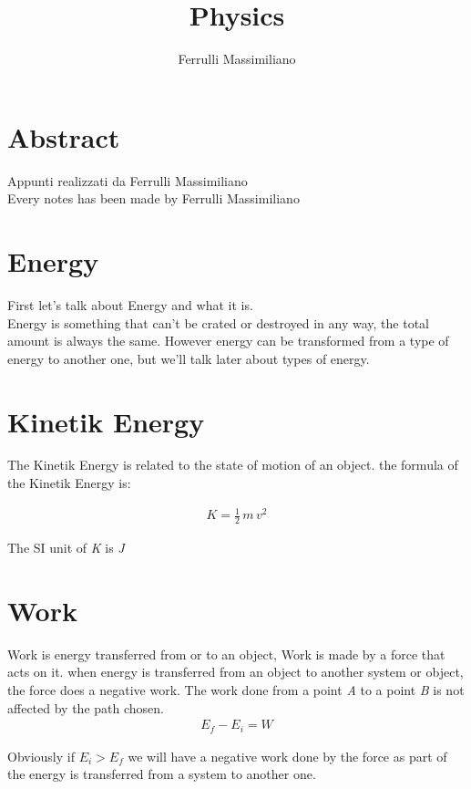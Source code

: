 \documentclass{article}
\title{Physics}
\author{Ferrulli Massimiliano}
\date{}
\begin{document}
\maketitle

\section*{Abstract}
Appunti realizzati da Ferrulli Massimiliano
\\
Every notes has been made by Ferrulli Massimiliano
\pagebreak

\tableofcontents
\pagebreak

\section{Energy}
First let's talk about Energy and what it is.
\\
Energy is something that can't be crated or destroyed in any way, the total amount is always the same.
However energy can be transformed from a type of energy to another one, but we'll talk later about types of energy.

\section{Kinetik Energy}
The Kinetik Energy \textit{} is related to the state of motion of an object. the formula of the Kinetik Energy is:

\begin{align*}  
\textit{K} = \frac{1}{2} \, \textit{m} \, v^2
\end{align*}

\begin{center} 
The SI unit of \textit{K} is \textit{J} 
\end{center}
\section{Work}
Work is energy transferred from or to an object, Work is made by a force that acts on it.
when energy is transferred from an object to another system or object, the force does a negative work.
The work done from a point \textit{A} to a point \textit{B} is not affected by the path chosen.
\begin{align*}  
E_f - E_i = W
\end{align*}

Obviously if \(E_i>E_f\) we will have a negative work done by the force as part of the energy is 
transferred from a system to another one. 
\end{document}
